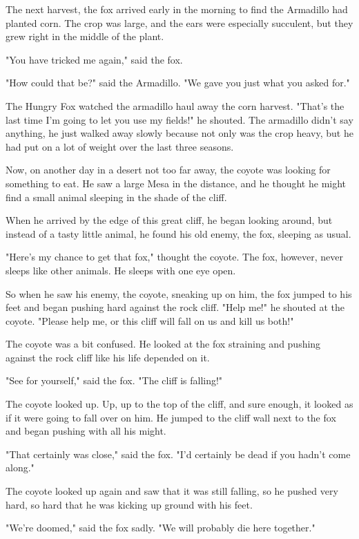 The next harvest, the fox arrived early in the morning to find the Armadillo had planted corn. The crop was large, and the ears were especially succulent, but they grew right in the middle of the plant.

"You have tricked me again," said the fox.

"How could that be?" said the Armadillo. "We gave you just what you asked for."

The Hungry Fox watched the armadillo haul away the corn harvest. "That's the last time I'm going to let you use my fields!" he shouted. The armadillo didn't say anything, he just walked away slowly because not only was the crop heavy, but he had put on a lot of weight over the last three seasons.

Now, on another day in a desert not too far away, the coyote was looking for something to eat. He saw a large Mesa in the distance, and he thought he might find a small animal sleeping in the shade of the cliff.

When he arrived by the edge of this great cliff, he began looking around, but instead of a tasty little animal, he found his old enemy, the fox, sleeping as usual.

"Here's my chance to get that fox," thought the coyote. The fox, however, never sleeps like other animals. He sleeps with one eye open.

So when he saw his enemy, the coyote, sneaking up on him, the fox jumped to his feet and began pushing hard against the rock cliff. "Help me!" he shouted at the coyote. "Please help me, or this cliff will fall on us and kill us both!"

The coyote was a bit confused. He looked at the fox straining and pushing against the rock cliff like his life depended on it.

"See for yourself," said the fox. "The cliff is falling!"

The coyote looked up. Up, up to the top of the cliff, and sure enough, it looked as if it were going to fall over on him. He jumped to the cliff wall next to the fox and began pushing with all his might.

"That certainly was close," said the fox. "I'd certainly be dead if you hadn't come along."

The coyote looked up again and saw that it was still falling, so he pushed very hard, so hard that he was kicking up ground with his feet.

"We're doomed," said the fox sadly. "We will probably die here together."

